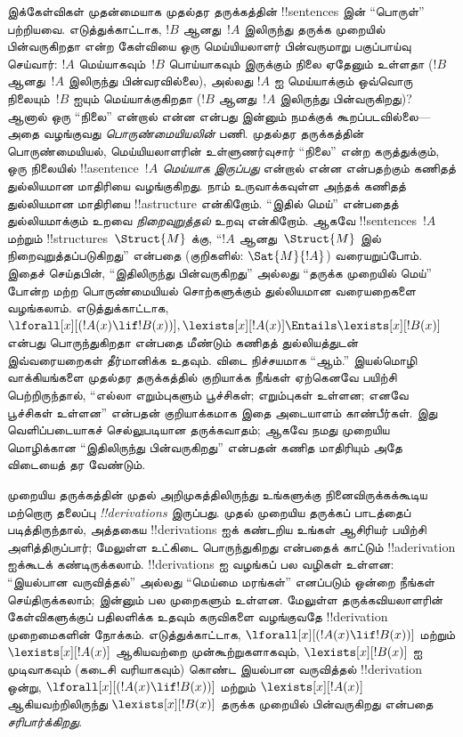 \documentclass[../../../include/open-logic-section]{subfiles}
\begin{document}
இக்கேள்விகள் முதன்மையாக முதல்தர தருக்கத்தின் !!{sentence}s இன்
``பொருள்'' பற்றியவை. எடுத்துக்காட்டாக, $!B$ ஆனது~$!A$ இலிருந்து தருக்க
முறையில் பின்வருகிறதா என்ற கேள்வியை ஒரு மெய்யியலாளர் பின்வருமாறு பகுப்பாய்வு
செய்வார்: $!A$ மெய்யாகவும்~$!B$ பொய்யாகவும் இருக்கும் நிலை ஏதேனும் உள்ளதா
($!B$ ஆனது~$!A$ இலிருந்து பின்வரவில்லை), அல்லது $!A$ ஐ மெய்யாக்கும் ஒவ்வொரு
நிலையும்~$!B$ ஐயும் மெய்யாக்குகிறதா ($!B$ ஆனது~$!A$ இலிருந்து பின்வருகிறது)?
ஆனால் ஒரு ``நிலை'' என்றால் என்ன என்பது இன்னும் நமக்குக் கூறப்படவில்லை---அதை
வழங்குவது \emph{பொருண்மையியலின்} பணி. முதல்தர தருக்கத்தின் பொருண்மையியல்,
மெய்யியலாளரின் உள்ளுணர்வுசார் ``நிலை'' என்ற கருத்துக்கும், ஒரு நிலையில்
!!a{sentence}~$!A$ \emph{மெய்யாக இருப்பது} என்றால் என்ன என்பதற்கும்
கணிதத் துல்லியமான மாதிரியை வழங்குகிறது. நாம் உருவாக்கவுள்ள அந்தக் கணிதத்
துல்லியமான மாதிரியை !!a{structure} என்கிறோம். ``இதில் மெய்'' என்பதைத்
துல்லியமாக்கும் உறவை \emph{நிறைவுறுத்தல்} உறவு என்கிறோம். ஆகவே
!!{sentence}s~$!A$ மற்றும் !!{structure}s~$\Struct{M}$ க்கு,
``$!A$ ஆனது~$\Struct{M}$ இல் நிறைவுறுத்தப்படுகிறது'' என்பதை (குறிகளில்:
$\Sat{M}{!A}$) வரையறுப்போம். இதைச் செய்தபின், ``இதிலிருந்து பின்வருகிறது''
அல்லது ``தருக்க முறையில் மெய்'' போன்ற மற்ற பொருண்மையியல் சொற்களுக்கும்
துல்லியமான வரையறைகளை வழங்கலாம். எடுத்துக்காட்டாக,
$\lforall[x][(!A(x) \lif !B(x))], \lexists[x][!A(x)] \Entails
\lexists[x][!B(x)]$ என்பது பொருந்துகிறதா என்பதை மீண்டும் கணிதத் துல்லியத்துடன்
இவ்வரையறைகள் தீர்மானிக்க உதவும். விடை நிச்சயமாக ``ஆம்.'' இயல்மொழி
வாக்கியங்களை முதல்தர தருக்கத்தில் குறியாக்க நீங்கள் ஏற்கெனவே பயிற்சி
பெற்றிருந்தால், ``எல்லா எறும்புகளும் பூச்சிகள்; எறும்புகள் உள்ளன; எனவே
பூச்சிகள் உள்ளன'' என்பதன் குறியாக்கமாக இதை அடையாளம் காண்பீர்கள். இது
வெளிப்படையாகச் செல்லுபடியான தருக்கவாதம்; ஆகவே நமது முறையிய மொழிக்கான
``இதிலிருந்து பின்வருகிறது'' என்பதன் கணித மாதிரியும் அதே விடையைத் தர வேண்டும்.

முறையிய தருக்கத்தின் முதல் அறிமுகத்திலிருந்து உங்களுக்கு நினைவிருக்கக்கூடிய
மற்றொரு தலைப்பு \emph{!!{derivation}s} இருப்பது. முதல் முறையிய தருக்கப்
பாடத்தைப் படித்திருந்தால், அத்தகைய !!{derivation}s ஐக் கண்டறிய உங்கள்
ஆசிரியர் பயிற்சி அளித்திருப்பார்; மேலுள்ள உட்கிடை பொருந்துகிறது என்பதைக்
காட்டும் !!a{derivation} ஐக்கூடக் கண்டிருக்கலாம். !!{derivation}s ஐ வழங்கப்
பல வழிகள் உள்ளன: ``இயல்பான வருவித்தல்'' அல்லது ``மெய்மை மரங்கள்'' எனப்படும்
ஒன்றை நீங்கள் செய்திருக்கலாம்; இன்னும் பல முறைகளும் உள்ளன. மேலுள்ள
தருக்கவியலாளரின் கேள்விகளுக்குப் பதிலளிக்க உதவும் கருவிகளை வழங்குவதே
!!{derivation} முறைமைகளின் நோக்கம். எடுத்துக்காட்டாக,
$\lforall[x][(!A(x) \lif !B(x))]$ மற்றும் $\lexists[x][!A(x)]$ ஆகியவற்றை
முன்கூற்றுகளாகவும், $\lexists[x][!B(x)]$ ஐ முடிவாகவும் (கடைசி வரியாகவும்)
கொண்ட இயல்பான வருவித்தல் !!{derivation} ஒன்று, $\lforall[x][(!A(x) \lif
!B(x))]$ மற்றும் $\lexists[x][!A(x)]$ ஆகியவற்றிலிருந்து
$\lexists[x][!B(x)]$ தருக்க முறையில் பின்வருகிறது என்பதை \emph{சரிபார்க்கிறது}.
\end{document}

